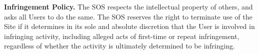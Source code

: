\textbf{Infringement Policy.}
The SOS respects the intellectual property of others, and asks all Users to do
the same. The SOS reserves the right to terminate use of the Site if it
determines in its sole and absolute discretion that the User is involved in
infringing activity, including alleged acts of first-time or repeat
infringement, regardless of whether the activity is ultimately determined to be
infringing.
